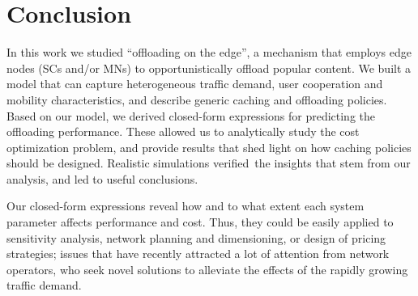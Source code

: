 \documentclass[10pt,conference,letterpaper]{IEEEtran}
\begin{document}
\section{Conclusion}
In this work we studied ``offloading on the edge'', a mechanism that employs edge nodes (SCs and/or MNs) to opportunistically offload popular content. We built a model that can capture heterogeneous traffic demand, user cooperation and mobility characteristics, and describe generic caching and offloading policies. Based on our model, we derived closed-form expressions for predicting the offloading performance. These allowed us to analytically study the cost optimization problem, and provide results that shed light on how caching policies should be designed. Realistic simulations verified~the insights that stem from our analysis, and led to useful conclusions.

Our closed-form expressions reveal how and to what extent each system parameter affects performance and cost. Thus, they could be easily applied to sensitivity analysis, network planning and dimensioning, or design of pricing strategies; issues that have recently attracted a lot of attention from network operators, who seek novel solutions to alleviate the effects of the rapidly growing traffic demand.
\end{document}

